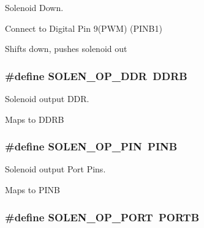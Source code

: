Solenoid Down. 


\begin{DoxyItemize}
\item Connect to Digital Pin 9(P\-W\-M) (P\-I\-N\-B1)
\begin{DoxyItemize}
\item Shifts down, pushes solenoid out 
\end{DoxyItemize}
\end{DoxyItemize}\hypertarget{group__port_defs_ga3ca3b069d7464c17c03b5b1e7da788fd}{
\subsubsection[{S\-O\-L\-E\-N\-\_\-\-O\-P\-\_\-\-D\-D\-R}]{\setlength{\rightskip}{0pt plus 5cm}\#define {\bf S\-O\-L\-E\-N\-\_\-\-O\-P\-\_\-\-D\-D\-R}~D\-D\-R\-B}}\label{group__port_defs_ga3ca3b069d7464c17c03b5b1e7da788fd}


Solenoid output D\-D\-R. 

Maps to D\-D\-R\-B \hypertarget{group__port_defs_ga473a2cf5e606d18feb583ec4749a49ea}{
\subsubsection[{S\-O\-L\-E\-N\-\_\-\-O\-P\-\_\-\-P\-I\-N}]{\setlength{\rightskip}{0pt plus 5cm}\#define {\bf S\-O\-L\-E\-N\-\_\-\-O\-P\-\_\-\-P\-I\-N}~P\-I\-N\-B}}\label{group__port_defs_ga473a2cf5e606d18feb583ec4749a49ea}


Solenoid output Port Pins. 

Maps to P\-I\-N\-B \hypertarget{group__port_defs_ga4ad600582a951bdd4b75311388dc6ae7}{
\subsubsection[{S\-O\-L\-E\-N\-\_\-\-O\-P\-\_\-\-P\-O\-R\-T}]{\setlength{\rightskip}{0pt plus 5cm}\#define {\bf S\-O\-L\-E\-N\-\_\-\-O\-P\-\_\-\-P\-O\-R\-T}~P\-O\-R\-T\-B}}\label{group__port_defs_ga4ad600582a951bdd4b75311388dc6ae7}


